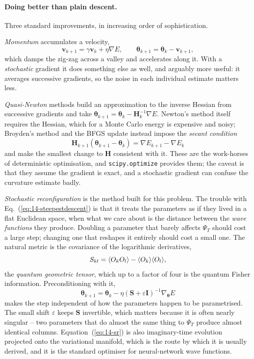 \paragraph{Doing better than plain descent.}
Three standard improvements, in increasing order of sophistication.

\emph{Momentum} accumulates a velocity,
\begin{equation}
  \bm{v}_{k+1} = \gamma\bm{v}_k + \eta\nabla E,
  \qquad
  \bm{\theta}_{k+1} = \bm{\theta}_k - \bm{v}_{k+1} ,
  \label{eq:14-momentum}
\end{equation}
which damps the zig-zag across a valley and accelerates along it.  With a
\emph{stochastic} gradient it does something else as well, and arguably more
useful: it averages successive gradients, so the noise in each individual
estimate matters less.

\emph{Quasi-Newton} methods build an approximation to the inverse Hessian from
successive gradients and take
$\bm{\theta}_{k+1}=\bm{\theta}_k-\bm{H}_k^{-1}\nabla E$.  Newton's method
itself requires the Hessian, which for a Monte Carlo energy is expensive and
noisy; Broyden's method and the BFGS update instead impose the \emph{secant
condition}
\begin{equation}
  \bm{H}_{k+1}\left(\bm{\theta}_{k+1}-\bm{\theta}_k\right)
   = \nabla E_{k+1} - \nabla E_k
  \label{eq:14-secant}
\end{equation}
and make the smallest change to $\bm{H}$ consistent with it.  These are the
work-horses of deterministic optimisation, and \texttt{scipy.optimize}
provides them; the caveat is that they assume the gradient is exact, and a
stochastic gradient can confuse the curvature estimate badly.

\emph{Stochastic reconfiguration} is the method built for this problem.  The
trouble with Eq.~(\ref{eq:14-steepestdescent}) is that it treats the
parameters as if they lived in a flat Euclidean space, when what we care about
is the distance between the \emph{wave functions} they produce.  Doubling a
parameter that barely affects $\Psi_T$ should cost a large step; changing one
that reshapes it entirely should cost a small one.  The natural metric is the
covariance of the logarithmic derivatives,
\begin{equation}
  S_{kl} = \langle O_k O_l \rangle - \langle O_k \rangle\langle O_l \rangle,
  \label{eq:14-metric}
\end{equation}
the \emph{quantum geometric tensor}, which up to a factor of four is the
quantum Fisher information.  Preconditioning with it,
\begin{equation}
  \boxed{\;
  \bm{\theta}_{k+1} = \bm{\theta}_k
   - \eta\left(\bm{S}+\varepsilon\bm{I}\right)^{-1}\nabla_{\bm{\theta}}E \;}
  \label{eq:14-sr}
\end{equation}
makes the step independent of how the parameters happen to be parametrised.
The small shift $\varepsilon$ keeps $\bm{S}$ invertible, which matters because
it is often nearly singular -- two parameters that do almost the same thing to
$\Psi_T$ produce almost identical columns.  Equation~(\ref{eq:14-sr}) is also
imaginary-time evolution projected onto the variational manifold, which is the
route by which it is usually derived, and it is the standard optimiser for
neural-network wave functions.

